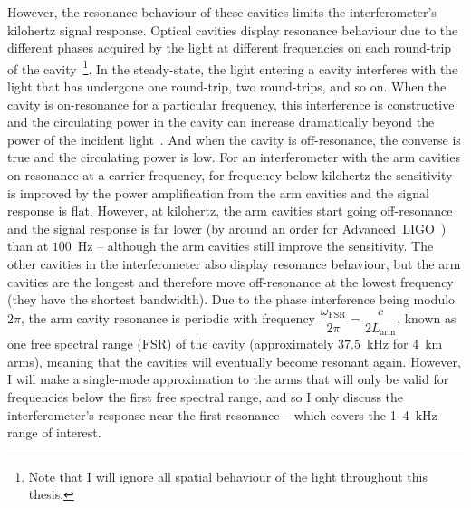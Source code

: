 However, the resonance behaviour of these cavities limits the interferometer's kilohertz signal response. Optical cavities display resonance behaviour due to the different phases acquired by the light at different frequencies on each round-trip of the cavity~\footnote{Note that I will ignore all spatial behaviour of the light throughout this thesis.}. In the steady-state, the light entering a cavity interferes with the light that has undergone one round-trip, two round-trips, and so on. When the cavity is on-resonance for a particular frequency, this interference is constructive and the circulating power in the cavity can increase dramatically beyond the power of the incident light~\cite{}. And when the cavity is off-resonance, the converse is true and the circulating power is low. 
For an interferometer with the arm cavities on resonance at a carrier frequency, for frequency below kilohertz the sensitivity is improved by the power amplification from the arm cavities and the signal response is flat. However, at kilohertz, the arm cavities start going off-resonance and the signal response is far lower (by around an order for Advanced~LIGO~\cite{}) than at $100$~Hz -- although the arm cavities still improve the sensitivity. The other cavities in the interferometer also display resonance behaviour, but the arm cavities are the longest and therefore move off-resonance at the lowest frequency (they have the shortest bandwidth).
Due to the phase interference being modulo $2\pi$, the arm cavity resonance is periodic with frequency $\dfrac{\omega_\text{FSR}}{2\pi}=\dfrac{c}{2L_\text{arm}}$, known as one free spectral range (FSR) of the cavity (approximately $37.5$~kHz for 4~km arms), meaning that the cavities will eventually become resonant again. However, I will make a single-mode approximation to the arms that will only be valid for frequencies below the first free spectral range, and so I only discuss the interferometer's response near the first resonance -- which covers the 1--4~kHz range of interest.

